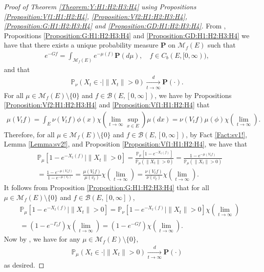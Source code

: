 \documentclass[12pt,a4paper]{amsart}
\numberwithin{equation}{section}
\theoremstyle{plain}
\theoremstyle{definition}
\theoremstyle{remark}
\begin{document}
\begin{proof}[ Proof of Theorem \ref{Theorem:Y:H1:H2:H3:H4} using Propositions \ref{Proposition:Vf1:H1:H2:H4}, \ref{Proposition:Vf2:H1:H2:H3:H4}, \ref{Proposition:G:H1:H2:H3:H4} and \ref{Proposition:GD:H1:H2:H3:H4}]
From \cite[Proposition 1.19]{Li2011MeasureValued}, Propositions \ref{Proposition:G:H1:H2:H3:H4} and \ref{Proposition:GD:H1:H2:H3:H4}  we have that there exists a unique probability measure $\mathbf P$ on $\mathcal M_f(E)$ such that
\begin{align}
 e^{-Gf}
 = \int_{\mathcal M_f(E)} e^{- \mu(f)} \mathbf P(d\mu),
 \quad f\in C_b (E, [0,\infty)),
\end{align}
and that
\begin{align}
 \mathbb P_{\nu}(X_t \in \cdot | \|X_t\|>0 )
 \xrightarrow[t\to \infty]{d} \mathbf P(\cdot).
 \end{align}
For all $\mu \in \mathcal M_f(E)\setminus \{0\}$ and $f \in \mathcal B(E,[0,\infty])$, we have by Propositions \ref{Proposition:Vf2:H1:H2:H3:H4} and \ref{Proposition:Vf1:H1:H2:H4} that
\begin{align}
\mu(V_tf)
 = \int_E \nu(V_tf) \phi(x) \chi(\lim_{t\to \infty}\sup_{x\in E}) \mu(dx)
 = \nu(V_tf) \mu(\phi)\chi(\lim_{t\to \infty}).
\end{align}
Therefore, for all $\mu \in \mathcal M_f(E)\setminus\{0\}$ and $f\in \mathcal B(E,[0,\infty])$, by Fact \ref{Fact:sv1!}, Lemma \ref{Lemma:sv2!}, and Proposition \ref{Proposition:Vf1:H1:H2:H4}, we have that
\begin{align}
 &\mathbb P_\mu [1 - e^{-X_t(f)}|\|X_t\|>0]
 = \frac{\mathbb P_\mu [ 1 - e^{- X_t(f)}]} {\mathbb P_\mu (\|X_t\| > 0) }
 = \frac{1 - e^{- \mu(V_tf)}} { \mathbb P_\mu(\|X_t\| > 0)}
 \\&= \frac{1 - e^{- \mu(V_tf)}} {1 - e^{-\mu(v_t)}}
 = \frac{ \mu(V_t f) }{ \mu(v_t) }  \chi(\lim_{t\to \infty})
 = \frac{ \nu(V_tf) }{ \nu(v_t) } \chi(\lim_{t\to \infty}).
 \end{align}
It follows from Proposition \ref{Proposition:G:H1:H2:H3:H4} that for all $\mu \in \mathcal M_f(E)\setminus\{0\}$ and $f\in \mathcal B(E,[0,\infty])$,
\begin{align}
  &\mathbb P_\mu [1 - e^{-X_t(f)}|\|X_t\|>0]
 = \mathbb P_\nu [1 - e^{-X_t(f)}|\|X_t\|>0] \chi(\lim_{t\to \infty})
 \\&= (1 - e^{- \Gamma_t f}) \chi(\lim_{t\to \infty})
 = (1 - e^{-Gf}) \chi(\lim_{t\to \infty}).
 \end{align}
Now by \cite[Proposition 1.19]{Li2011MeasureValued}, we have for any $\mu \in \mathcal M_f(E)\setminus\{0\}$,
\begin{align}
 \mathbb P_\mu(X_t \in \cdot | \|X_t\|>0)
 \xrightarrow[t\to \infty]{d} \mathbf P(\cdot)
 \end{align}
as desired.
\end{proof}
\end{document}
